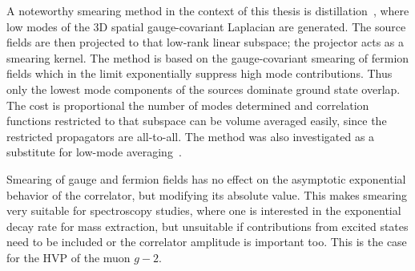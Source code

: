 
A noteworthy smearing method in the context of this thesis is distillation~\cite{HadronSpectrum:2009krc,Knechtli:2022bji}, where low modes of the 3D spatial gauge-covariant Laplacian are generated.
The source fields are then projected to that low-rank linear subspace; the projector acts as a smearing kernel.
The method is based on the gauge-covariant smearing of fermion fields which in the limit exponentially suppress high mode contributions.
Thus only the lowest mode components of the sources dominate ground state overlap.
The cost is proportional the number of modes determined and correlation functions restricted to that subspace can be volume averaged easily, since the restricted propagators are all-to-all.
The method was also investigated as a substitute for low-mode averaging~\cite{Bushnaq:2023}.

Smearing of gauge and fermion fields has no effect on the asymptotic exponential behavior of the correlator, but modifying its absolute value.
This makes smearing very suitable for spectroscopy studies, where one is interested in the exponential decay rate for mass extraction, but unsuitable if contributions from excited states need to be included or the correlator amplitude is important too.
This is the case for the HVP of the muon $g-2$.

